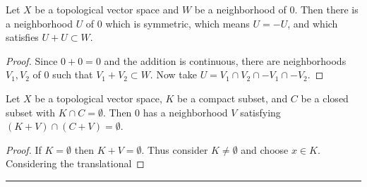 \begin{prop} Let $X$ be a topological vector space and $W$ be a neighborhood of $0$. Then there is a neighborhood $U$ of $0$ which is symmetric, which means $U=-U$, and which satisfies $U+U\subset W$.
\end{prop}
\begin{proof}
Since $0+0=0$ and the addition is continuous, there are neighborhoods $V_1,V_2$ of $0$ such that $V_1+V_2\subset W$. Now take $U=V_1\cap V_2\cap -V_1\cap -V_2$.
\end{proof}

\begin{thm} Let $X$ be a topological vector space, $K$ be a compact subset, and $C$ be a closed subset with $K\cap C=\emptyset$. Then $0$ has a neighborhood $V$ satisfying $(K+V)\cap (C+V)=\emptyset$.
\end{thm}
\begin{proof} If $K=\emptyset$ then $K+V=\emptyset$. Thus consider $K\neq \emptyset$ and choose $x\in K$. Considering the translational 
\end{proof}
\noindent\rule{\textwidth}{1pt}
\newline